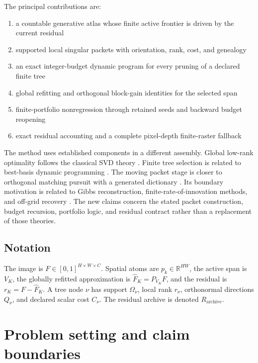 \documentclass[11pt]{article}
\theoremstyle{definition}
\theoremstyle{remark}
\newcommand{\R}{\mathbb R}
\begin{document}
The principal contributions are:
\begin{enumerate}
\item a countable generative atlas whose finite active frontier is driven by the current residual
\item supported local singular packets with orientation, rank, cost, and genealogy
\item an exact integer-budget dynamic program for every pruning of a declared finite tree
\item global refitting and orthogonal block-gain identities for the selected span
\item finite-portfolio nonregression through retained seeds and backward budget reopening
\item exact residual accounting and a complete pixel-depth finite-raster fallback
\end{enumerate}

The method uses established components in a different assembly. Global low-rank optimality follows the classical SVD theory \cite{EckartYoung}. Finite tree selection is related to best-basis dynamic programming \cite{CoifmanWickerhauser}. The moving packet stage is closer to orthogonal matching pursuit with a generated dictionary \cite{PatiOMP}. Its boundary motivation is related to Gibbs reconstruction, finite-rate-of-innovation methods, and off-grid recovery \cite{GottliebShu,Vetterli,CandesFernandezGranda,Batenkov,OngieJacob}. The new claims concern the stated packet construction, budget recursion, portfolio logic, and residual contract rather than a replacement of those theories.

\subsection*{Notation}
The image is $F\in[0,1]^{H\times W\times C}$. Spatial atoms are $p_k\in\R^{HW}$, the active span is $V_K$, the globally refitted approximation is $\widehat F_K=P_{V_K}F$, and the residual is $r_K=F-\widehat F_K$. A tree node $\nu$ has support $\Omega_\nu$, local rank $r_\nu$, orthonormal directions $Q_\nu$, and declared scalar cost $C_\nu$. The residual archive is denoted $R_{\mathrm{archive}}$.

\begingroup
\small
\setlength{\parskip}{0pt}
\tableofcontents
\endgroup
\clearpage
\FloatBarrier
\section{Problem setting and claim boundaries}
\end{document}
